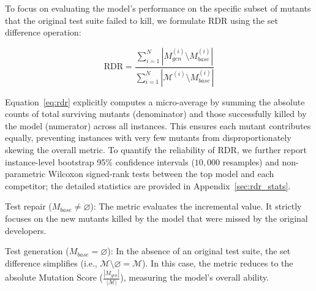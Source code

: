\documentclass[11pt]{article}
\begin{document}
To focus on evaluating the model's performance on the specific subset of mutants that the original test suite failed to kill, we formulate RDR using the set difference operation:

\begin{equation} \label{eq:rdr}
    \text{RDR} = \frac{\sum_{i=1}^{N} \left| M_{gen}^{(i)} \setminus M_{base}^{(i)} \right|}{\sum_{i=1}^{N} \left| \mathcal{M}^{(i)} \setminus M_{base}^{(i)} \right|}
\end{equation}

Equation~\ref{eq:rdr} explicitly computes a micro-average by summing the absolute counts of total surviving mutants (denominator) and those successfully killed by the model (numerator) across all instances. This ensures each mutant contributes equally, preventing instances with very few mutants from disproportionately skewing the overall metric. To quantify the reliability of RDR, we further report instance-level bootstrap 95\% confidence intervals ($10{,}000$ resamples) and non-parametric Wilcoxon signed-rank tests between the top model and each competitor; the detailed statistics are provided in Appendix~\ref{sec:rdr_stats}.

Test repair ($M_{base} \neq \varnothing$): 
    The metric evaluates the incremental value. It strictly focuses on the new mutants killed by the model that were missed by the original developers.
    
Test generation ($M_{base} = \varnothing$): 
    In the absence of an original test suite, the set difference simplifies (i.e., $\mathcal{M} \setminus \varnothing = \mathcal{M}$). In this case, the metric reduces to the absolute Mutation Score ($\frac{|M_{gen}|}{|\mathcal{M}|}$), measuring the model's overall ability.
\end{document}
